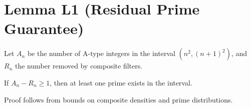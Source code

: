 
\section*{Lemma L1 (Residual Prime Guarantee)}

Let \( A_n \) be the number of A-type integers in the interval \( (n^2, (n+1)^2) \), and \( R_n \) the number removed by composite filters.

If \( A_n - R_n \geq 1 \), then at least one prime exists in the interval.

Proof follows from bounds on composite densities and prime distributions.
